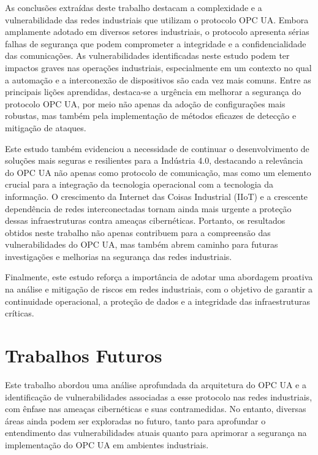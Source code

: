     As conclusões extraídas deste trabalho destacam a complexidade e a vulnerabilidade das redes industriais que utilizam o protocolo OPC UA. Embora amplamente adotado em diversos setores industriais, o protocolo apresenta sérias falhas de segurança que podem comprometer a integridade e a confidencialidade das comunicações. As vulnerabilidades identificadas neste estudo podem ter impactos graves nas operações industriais, especialmente em um contexto no qual a automação e a interconexão de dispositivos são cada vez mais comuns. Entre as principais lições aprendidas, destaca-se a urgência em melhorar a segurança do protocolo OPC UA, por meio não apenas da adoção de configurações mais robustas, mas também pela implementação de métodos eficazes de detecção e mitigação de ataques.

    Este estudo também evidenciou a necessidade de continuar o desenvolvimento de soluções mais seguras e resilientes para a Indústria 4.0, destacando a relevância do OPC UA não apenas como protocolo de comunicação, mas como um elemento crucial para a integração da tecnologia operacional com a tecnologia da informação. O crescimento da Internet das Coisas Industrial (IIoT) e a crescente dependência de redes interconectadas tornam ainda mais urgente a proteção dessas infraestruturas contra ameaças cibernéticas. Portanto, os resultados obtidos neste trabalho não apenas contribuem para a compreensão das vulnerabilidades do OPC UA, mas também abrem caminho para futuras investigações e melhorias na segurança das redes industriais.

    Finalmente, este estudo reforça a importância de adotar uma abordagem proativa na análise e mitigação de riscos em redes industriais, com o objetivo de garantir a continuidade operacional, a proteção de dados e a integridade das infraestruturas críticas.

\section{Trabalhos Futuros}

    Este trabalho abordou uma análise aprofundada da arquitetura do OPC UA e a identificação de vulnerabilidades associadas a esse protocolo nas redes industriais, com ênfase nas ameaças cibernéticas e suas contramedidas. No entanto, diversas áreas ainda podem ser exploradas no futuro, tanto para aprofundar o entendimento das vulnerabilidades atuais quanto para aprimorar a segurança na implementação do OPC UA em ambientes industriais.


